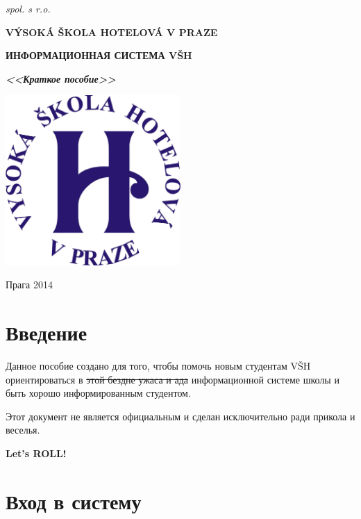 \documentclass[a4paper,12pt]{article}
\begin{document}

\thispagestyle{empty}
\begin{center}
	\textit{spol. s r.o.}
	\vspace{0.5ex}
	
	\textbf{VÝSOKÁ ŠKOLA HOTELOVÁ V PRAZE}
\end{center}
\vspace{13ex}

\begin{center}
	\vspace{13ex}
	\textbf{ИНФОРМАЦИОННАЯ СИСТЕМА VŠH}
	\vspace{1ex}
	
	\textbf{\textit{<<Краткое пособие>>}}
	
	\vfill
	\includegraphics[width=0.5\textwidth]{logo}
	
	\vfill
	Прага 2014
\end{center}

\newpage

\section{Введение}

Данное пособие создано для того, чтобы помочь новым студентам VŠH ориентироваться в \sout{этой бездне ужаса и ада}
информационной системе школы и быть хорошо информированным студентом.

Этот документ не является официальным и сделан исключительно ради прикола и веселья.

\vspace{15ex}
\textbf{Let's ROLL!}

\newpage

\section{Вход в систему}
\end{document}
